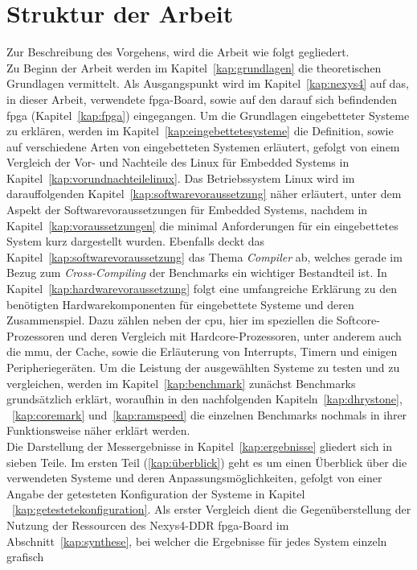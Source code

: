 \section{Struktur der Arbeit}\label{kap:strukturderarbeit}

Zur Beschreibung des Vorgehens, wird die Arbeit wie folgt gegliedert.\\
 Zu Beginn der Arbeit werden im Kapitel~\ref{kap:grundlagen} die theoretischen Grundlagen vermittelt. Als
Ausgangspunkt wird im Kapitel~\ref{kap:nexys4} auf das, in dieser Arbeit, verwendete \ac{fpga}-Board, sowie auf den darauf sich befindenden \ac{fpga} (Kapitel~\ref{kap:fpga}) eingegangen.
 Um die Grundlagen eingebetteter Systeme zu erklären, werden im Kapitel~\ref{kap:eingebettetesysteme} die Definition, sowie auf verschiedene Arten von eingebetteten Systemen erläutert, gefolgt von
 einem Vergleich der Vor- und Nachteile des Linux für Embedded Systems in Kapitel~\ref{kap:vorundnachteilelinux}. Das Betriebssystem Linux wird im darauffolgenden Kapitel~\ref{kap:softwarevoraussetzung} näher
 erläutert, unter dem Aspekt der Softwarevoraussetzungen für Embedded Systems, nachdem in Kapitel~\ref{kap:voraussetzungen} die minimal Anforderungen für ein eingebettetes System kurz dargestellt wurden.
 Ebenfalls deckt das Kapitel~\ref{kap:softwarevoraussetzung} das Thema \emph{Compiler} ab, welches gerade im Bezug zum \emph{Cross-Compiling} der Benchmarks ein wichtiger Bestandteil ist.
 In Kapitel~\ref{kap:hardwarevoraussetzung} folgt eine umfangreiche Erklärung zu den benötigten Hardwarekomponenten für eingebettete Systeme und deren Zusammenspiel. Dazu zählen neben der \ac{cpu}, hier im speziellen die
 Softcore-Prozessoren und deren Vergleich mit Hardcore-Prozessoren, unter anderem auch die \ac{mmu}, der Cache, sowie die Erläuterung von Interrupts, Timern und einigen Peripheriegeräten. Um die Leistung
 der ausgewählten Systeme zu testen und zu vergleichen, werden im Kapitel~\ref{kap:benchmark} zunächst Benchmarks grundsätzlich erklärt, woraufhin in den nachfolgenden Kapiteln~\ref{kap:dhrystone},
~\ref{kap:coremark} und~\ref{kap:ramspeed} die einzelnen Benchmarks nochmals in ihrer Funktionsweise näher erklärt werden.\\
Die Darstellung der Messergebnisse in Kapitel~\ref{kap:ergebnisse} gliedert sich in sieben Teile.
Im ersten Teil (\ref{kap:überblick}) geht es um einen Überblick über die verwendeten Systeme und deren Anpassungsmöglichkeiten, gefolgt von einer Angabe der getesteten Konfiguration der Systeme in Kapitel
~\ref{kap:getestetekonfiguration}.
Als erster Vergleich dient die Gegenüberstellung der Nutzung der Ressourcen des Nexys4-DDR \ac{fpga}-Board im Abschnitt~\ref{kap:synthese}, bei welcher die Ergebnisse für jedes System einzeln grafisch
